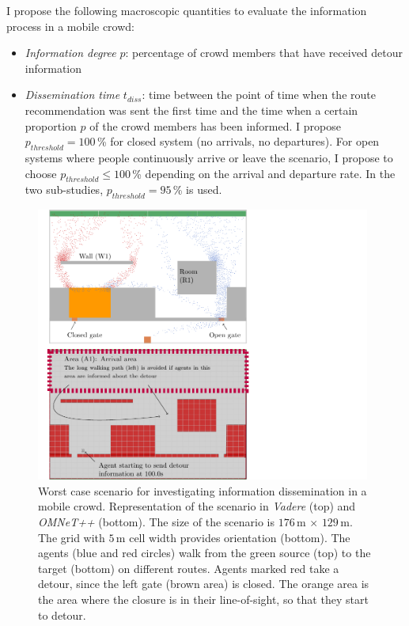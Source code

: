 I propose the following macroscopic quantities to evaluate the information process in a mobile crowd:
\begin{itemize}
\item \textit{Information degree} $p$: percentage of crowd members that have received detour information
\item \textit{Dissemination time} $t_{diss}$: time between the point of time when the route recommendation was sent the first time and the time when a certain proportion  $p$  of the crowd members has been informed. I propose $p_{threshold}=100\,$\% for closed system (no arrivals, no departures). For open systems where people continuously arrive or leave the scenario, I propose to choose $p_{threshold}\leq 100\,$\% depending on the arrival and departure rate. In the two sub-studies, $p_{threshold}=95\,$\% is used.
\end{itemize}



\begin{figure}[H]
\centering
\includegraphics[width=11cm,clip,trim={0.5cm 0 6.0cm 0}]{../figures/investigation/Informationsverbreitung/scenario.pdf} 
\caption[Worst case scenario for investigating information dissemination in a mobile crowd]{Worst case scenario for investigating information dissemination in a mobile crowd.  Representation of the scenario in \textit{Vadere} (top) and \textit{OMNeT++} (bottom). The size of the scenario is $176\,\text{m}\, \times \,129\,\text{m}$. The grid with $5\,\text{m}$ cell width provides orientation (bottom). The agents (blue and red circles) walk from the green source (top) to the target (bottom) on different routes. Agents marked red take a detour, since the left gate (brown area) is closed. The orange area is the area where the closure is in their line-of-sight, so that they start to detour. }
\label{fig:InfoDissSzenario}
\end{figure}




